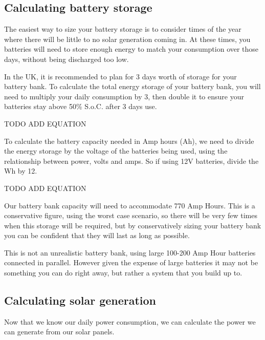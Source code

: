 \documentclass{article}
\theoremstyle{definition}
\theoremstyle{definition}
\theoremstyle{remark}
\begin{document}

  \subsection{Calculating battery storage} %
  \label{sub:calculating_battery_storage}

    The easiest way to size your battery storage is to consider times of the year where there will be little to no solar generation coming in. At these times, you batteries will need to store enough energy to match your consumption over those days, without being discharged too low.

    In the UK, it is recommended to plan for 3 days worth of storage for your battery bank. To calculate the total energy storage of your battery bank, you will need to multiply your daily consumption by 3, then double it to ensure your batteries stay above 50\% S.o.C. after 3 days use.

    TODO ADD EQUATION

    To calculate the battery capacity needed in Amp hours (Ah), we need to divide the energy storage by the voltage of the batteries being used, using the relationship between power, volts and amps. So if using 12V batteries, divide the Wh by 12.

    TODO ADD EQUATION

    Our battery bank capacity will need to accommodate 770 Amp Hours. This is a conservative figure, using the worst case scenario, so there will be very few times when this storage will be required, but by conservatively sizing your battery bank you can be confident that they will last as long as possible.

    This is not an unrealistic battery bank, using large 100-200 Amp Hour batteries connected in parallel. However given the expense of large batteries it may not be something you can do right away, but rather a system that you build up to.


  \subsection{Calculating solar generation} %
  \label{sub:calculating_solar_generation}

    Now that we know our daily power consumption, we can calculate the power we can generate from our solar panels.
\end{document}
